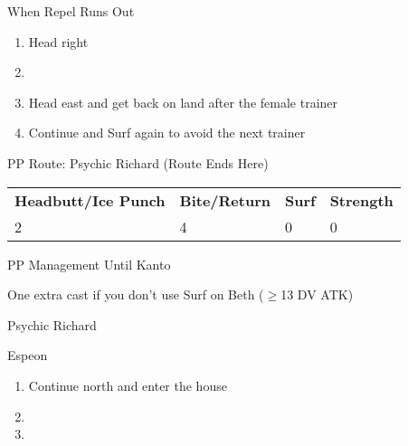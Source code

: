 \begin{paracol}{2}
\switchcolumn
\begin{menu}{When Repel Runs Out}
	\varwb
	\begin{packMenu}
		\item \superRepel
	\end{packMenu}
	\varwe
\end{menu}

\switchcolumn
\begin{enumerate}[resume]
	\item Head right 
	\item {}
	\item Head east and get back on land after the female trainer
	\item Continue and Surf again to avoid the next trainer
\end{enumerate}

\switchcolumn
\begin{misc}{PP Route: Psychic Richard (Route Ends Here)}
	\varwb
	\begin{tabu} to \textwidth {X[6,c] X[5,c] X[4,c] X[4,c]}
		\textbf{Headbutt/Ice Punch} & \textbf{Bite/Return} & \textbf{Surf} & \textbf{Strength}\\ 
		2 & 4 & 0 & 0
	\end{tabu}
	\varwe
\end{misc}

\begin{misc}{PP Management Until Kanto}
	\begin{notes}
		\item {}
		\item One extra cast if you don't use Surf on Beth ($\geq$13 DV ATK)
	\end{notes}
\end{misc}

\switchcolumn
\begin{trainer}{Psychic Richard}
	\varwb
	\begin{fightSection}{Espeon}
		\item {} \return
	\end{fightSection}
	\varwe
\end{trainer}

\begin{enumerate}[resume]
	\item Continue north and enter the house
	\item {}
	\item {}
\end{enumerate}


\end{paracol}
